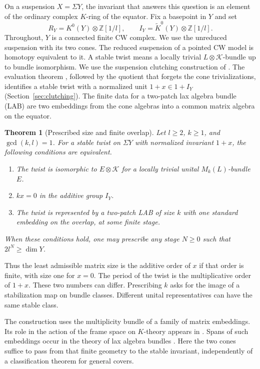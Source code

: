 \documentclass[11pt]{article}
\newtheorem{theorem}{Theorem}[section]
\newcommand{\K}{\mathcal K}
\newcommand{\Z}{\mathbb Z}
\newcommand{\RY}{R_Y}
\newcommand{\IY}{I_Y}
\begin{document}
On a suspension \(X=\Sigma Y\), the invariant that answers this question is an element of the ordinary complex \(K\)-ring of the equator. Fix a basepoint in \(Y\) and set
\[
  \RY=K^0(Y)\otimes\Z[1/l],\qquad
  \IY=\widetilde K^0(Y)\otimes\Z[1/l].
\]
Throughout, \(Y\) is a connected finite CW complex. We use the unreduced suspension with its two cones. The reduced suspension of a pointed CW model is homotopy equivalent to it. A stable twist means a locally trivial \(L\otimes\K\)-bundle up to bundle isomorphism. We use the suspension clutching construction of \cite[Section~4.2]{Pennig}. The evaluation theorem \cite[Theorem~2.22]{DP1}, followed by the quotient that forgets the cone trivializations, identifies a stable twist with a normalized unit \(1+x\in 1+\IY\) (Section~\ref{sec:clutching}). The finite data for a two-patch lax algebra bundle (LAB) are two embeddings from the cone algebras into a common matrix algebra on the equator.

\newpage
\begin{theorem}[Prescribed size and finite overlap]\label{thm:main}
Let \(l\geq2\), \(k\geq1\), and \(\gcd(k,l)=1\). For a stable twist on \(\Sigma Y\) with normalized invariant \(1+x\), the following conditions are equivalent.
\begin{enumerate}[label=\textup{(\roman*)}]
\item The twist is isomorphic to \(E\otimes\K\) for a locally trivial unital \(M_k(L)\)-bundle \(E\).
\item \(kx=0\) in the additive group \(\IY\).
\item The twist is represented by a two-patch LAB of size \(k\) with one standard embedding on the overlap, at some finite stage.
\end{enumerate}
When these conditions hold, one may prescribe \emph{any} stage \(N\geq0\) such that \(2l^N\geq\dim Y\).
\end{theorem}

Thus the least admissible matrix size is the additive order of \(x\) if that order is finite, with size one for \(x=0\). The period of the twist is the multiplicative order of \(1+x\). These two numbers can differ. Prescribing \(k\) asks for the image of a stabilization map on bundle classes. Different unital representatives can have the same stable class.

The construction uses the multiplicity bundle of a family of matrix embeddings. Its role in the action of the frame space on \(K\)-theory appears in \cite[Proposition 30 and Theorem 33]{ErshovEmb}. Spans of such embeddings occur in the theory of lax algebra bundles \cite[Example~3.6]{ErshovLAB}. Here the two cones suffice to pass from that finite geometry to the stable invariant, independently of a classification theorem for general covers.
\end{document}
